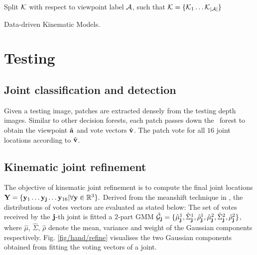 \begin{algorithm}
	Split $\mathcal{K}$ with respect to viewpoint label $\mathcal{A}$, such that $\mathcal{K} = \{ \mathcal{K}_{1} \dots \mathcal{K}_{|\mathcal{A}|} \}$\\
	\caption{Data-driven Kinematic Models.}
	\label{alg:kinematic}
\end{algorithm}

\section{Testing} 

\label{sec/hand/methodology:test}

\subsection{Joint classification and detection} Given a testing image, patches are extracted densely from the testing depth images. Similar to other decision forests, each patch passes down the \STR\ forest to obtain the viewpoint $\hat{\mathbf{a}}$ and vote vectors $\hat{\mathbf{v}}$. The patch vote for all $16$ joint locations according to $\hat{\mathbf{v}}$.   

\subsection{Kinematic joint refinement} 
The objective of kinematic joint refinement is to compute the final joint locations $\mathbf{Y} = \{ \mathbf{y}_{1} \dots \mathbf{y}_{\mathbf{j}} \dots \mathbf{y}_{16} | \forall \mathbf{y} \in \mathbb{R}^{3}\}. $
Derived from the meanshift technique in \cite{Girshick2011}, the distributions of votes vectors are evaluated as stated below: 
The set of votes received by the $\mathbf{j}$-th joint is fitted a $2$-part GMM $\hat{\mathcal{G}}_{\mathbf{j}} = \{ \hat{\mu}_{\mathbf{j}}^{1}, \hat{\Sigma}_{\mathbf{j}}^{1}, \hat{\rho}_{\mathbf{j}}^{1}, \hat{\mu}_{\mathbf{j}}^{2}, \hat{\Sigma}_{\mathbf{j}}^{2}, \hat{\rho}_{\mathbf{j}}^{2} \}$, where $\hat{\mu}$, $\hat{\Sigma}$, $\hat{\rho}$ denote the mean, variance and weight of the Gaussian components respectively. Fig. \ref{fig/hand/refine} visualises the two Gaussian components obtained from fitting the voting vectors of a joint.  

